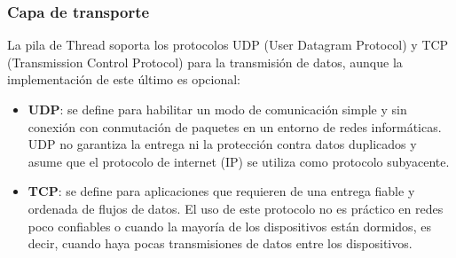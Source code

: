 \subsubsection{Capa de transporte} %
La pila de Thread soporta los protocolos UDP (User Datagram Protocol) y TCP (Transmission Control Protocol) para la transmisión de datos, aunque la implementación de este último es opcional:
\begin{itemize}
\item{\bf UDP}: se define para habilitar un modo de comunicación simple y sin conexión con conmutación de paquetes en un entorno de redes informáticas. UDP no garantiza la entrega ni la protección contra datos duplicados y asume que el protocolo de internet (IP) se utiliza como protocolo subyacente.
\item{\bf TCP}: se define para aplicaciones que requieren de una entrega fiable y ordenada de flujos de datos. El uso de este protocolo no es práctico en redes poco confiables o cuando la mayoría de los dispositivos están dormidos, es decir, cuando haya pocas transmisiones de datos entre los dispositivos.
\end{itemize}
\clearpage

